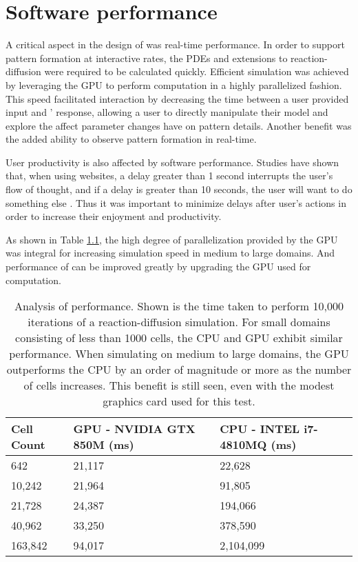 \chapter{Software performance}
A critical aspect in the design of \ProgramName{} was real-time performance. In order to support pattern formation at interactive rates, the PDEs and extensions to reaction-diffusion were required to be calculated quickly. Efficient simulation was achieved by leveraging the GPU to perform computation in a highly parallelized fashion. This speed facilitated interaction by decreasing the time between a user provided input and \ProgramName{}' response, allowing a user to directly manipulate their model and explore the affect parameter changes have on pattern details. Another benefit was the added ability to observe pattern formation in real-time.

User productivity is also affected by software performance. Studies have shown that, when using websites, a delay greater than 1 second interrupts the user's flow of thought, and if a delay is greater than 10 seconds, the user will want to do something else \citep{nielsen1994}. Thus it was important to minimize delays after user's actions in order to increase their enjoyment and productivity.

As shown in Table \ref{tab:perf}, the high degree of parallelization provided by the GPU was integral for increasing simulation speed in medium to large domains.   And performance of \ProgramName{} can be improved greatly by upgrading the GPU used for computation.

\begin{table}[ht]
	\centering
	\begin{tabular}{lll} \hline
	Cell Count & GPU - NVIDIA GTX 850M (ms)    & CPU - INTEL i7-4810MQ (ms)\\ \hline
	642      & 21,117 & 22,628    \\
	10,242   & 21,964 & 91,805    \\
	21,728   & 24,387 & 194,066   \\
	40,962   & 33,250 & 378,590   \\
	163,842  & 94,017 & 2,104,099 \\ \hline 
	\end{tabular}
	\caption[Analysis of \ProgramName{} performance]{Analysis of \ProgramName{} performance. Shown is the time taken to perform 10,000 iterations of a reaction-diffusion simulation. For small domains consisting of less than 1000 cells, the CPU and GPU exhibit similar performance. When simulating on medium to large domains, the GPU outperforms the CPU by an order of magnitude or more as the number of cells increases. This benefit is still seen, even with the modest graphics card used for this test.}
	\label{tab:perf}
\end{table}


